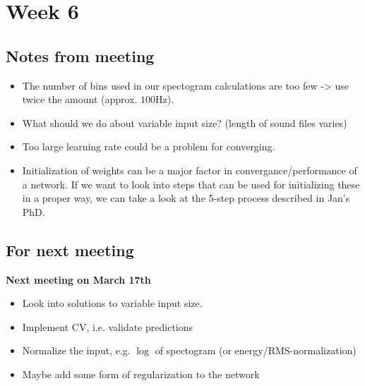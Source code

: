 
\section{Week 6}

\subsection{Notes from meeting}

\begin{itemize}
\item The number of bins used in our spectogram calculations are too few -> use twice the amount (approx. $100$Hz).
\item What should we do about variable input size? (length of sound files varies)
\item Too large learning rate could be a problem for converging.
\item Initialization of weights can be a major factor in convergance/performance of a network. If we want to look into steps that can be used for initializing these in a proper way, we can take a look at the 5-step process described in Jan's PhD.
\end{itemize}

\subsection{For next meeting}

\textbf{Next meeting on March 17th}

\begin{itemize}
\item Look into solutions to variable input size.
\item Implement CV, i.e. validate predictions
\item Normalize the input, e.g. $\log$ of spectogram (or energy/RMS-normalization)
\item Maybe add some form of regularization to the network
\end{itemize}
